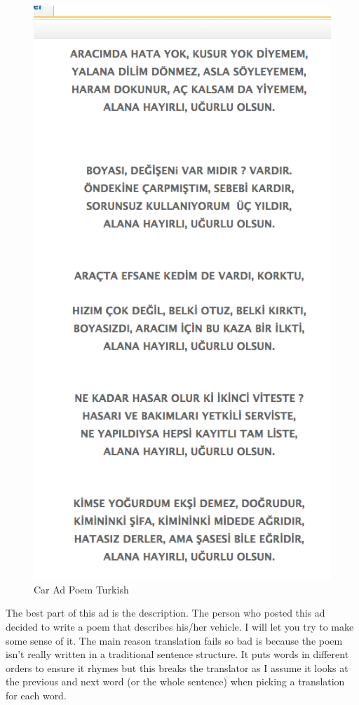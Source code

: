 \documentclass[10pt,letterpaper,bibliography=totoc]{scrartcl}
\begin{document}
\begin{figure}[h!]
\centering
\label{fig:poem_turkish}
\includegraphics[scale=.5]{poem_turkish.png}
\caption{Car Ad Poem Turkish}
\end{figure}
The best part of this ad is the description. The person who posted this ad decided to write a poem that describes his/her vehicle. I will let you try to make some sense of it. The main reason translation fails so bad is because the poem isn't really written in a traditional sentence structure. It puts words in different orders to ensure it rhymes but this breaks the translator as I assume it looks at the previous and next word (or the whole sentence) when picking a translation for each word. 
\end{document}
